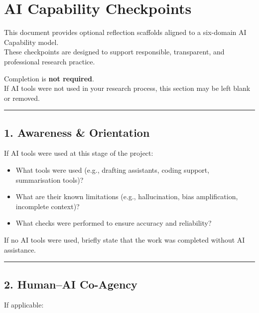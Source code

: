 \documentclass[
]{report}
\author{}
\date{}
\providecommand{\tightlist}{%
  \setlength{\itemsep}{0pt}\setlength{\parskip}{0pt}}
\renewcommand*\contentsname{Table of contents}
\newcommand\contentsname{Table of contents}
\begin{document}
\renewcommand*\contentsname{Table of contents}
{
\hypersetup{linkcolor=}
\setcounter{tocdepth}{2}
\tableofcontents
}

\chapter{AI Capability Checkpoints}\label{ai-capability-checkpoints}

This document provides optional reflection scaffolds aligned to a
six-domain AI Capability model.\\
These checkpoints are designed to support responsible, transparent, and
professional research practice.

Completion is \textbf{not required}.\\
If AI tools were not used in your research process, this section may be
left blank or removed.

\begin{center}\rule{0.5\linewidth}{0.5pt}\end{center}

\section{1. Awareness \& Orientation}\label{awareness-orientation}

If AI tools were used at this stage of the project:

\begin{itemize}
\tightlist
\item
  What tools were used (e.g., drafting assistants, coding support,
  summarisation tools)?
\item
  What are their known limitations (e.g., hallucination, bias
  amplification, incomplete context)?
\item
  What checks were performed to ensure accuracy and reliability?
\end{itemize}

If no AI tools were used, briefly state that the work was completed
without AI assistance.

\begin{center}\rule{0.5\linewidth}{0.5pt}\end{center}

\section{2. Human--AI Co-Agency}\label{humanai-co-agency}

If applicable:
\end{document}
